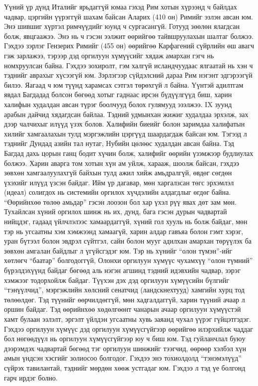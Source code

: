 Үүний үр дүнд Италийг ярьдаггүй юмаа гэхэд Рим хотын хүрээнд ч байлдах чадвар, цэргийн үүрэггүй шахам байсан Аларих (410 он) Римийг эзлэн авсан юм. Энэ шившиг хүртэл римчүүдийг юунд ч сургасангүй. Готууд зөөлөн ялагдсан болж, явцгаажээ. Энэ нь ч гэсэн ээлжит өөрийгөө тайвшруулахын шалтаг болжээ. Гэхдээ зэрлэг Гензерих Римийг (455 он) өөрийгөө Карфагений сүйрлийн өш авагч гэж зарлажээ, тэрээр дэд оргилуун хүмүүсийг хядаж амархан гэгч нь номхруулсан байна. Гэхдээ зохиролт, гэм халгүй исландчуудаас ялгаатай нь хэн ч тэднийг аврахыг хүсээгүй юм. Зэрлэгээр сүйдэлсний дараа Рим нэгэнт эдгэрээгүй билээ. Яагаад ч юм түүнд харамсах сэтгэл төрөхгүй л байна.
Үүнтэй адилтгам явдал Багдадад болсон бөгөөд хотыг гаднаас ирсэн бүдүүлгүүд биш, харин халифын худалдан авсан түрэг боолчууд болох гулямууд эзэлжээ. IX зуунд арабын дайчид хядагдсан байлаа. Тэдний удмынхан жижиг худалдаа эрхэлж, зах дээр чалчихыг илүүд үзэх болов. Халифийн биеийг болон заримдаа халифатын хилийг хамгаалахын тулд мэргэжлийн цэргүүд шаардагдаж байсан юм. Тэгээд л тэднийг Дундад азийн тал нутаг, Нубийн цөлөөс худалдан авсан байна. Тэд Багдад дахь цорын ганц бодит хүчин болж, халифийг өөрийн үзэмжээр будлиулах болжээ. Харин аварга том хотын хүн ам уйлж, харааж, шоолж байсан, гэхдээ зөвхөн хамгаалуулахгүй байхын тулд ажил хийж амьдралгүй, өвдөг сөгдөн үхэхийг илүүд үзсэн байдаг.
Ийм үр дагавар, мөн харгалзсан төгс эрхэмлэл (идеал) солигдох нь системийн оргилох хүчдэлийн алдагдлыг өгдөг байна. “Өөрийнхөө төлөө амьдар” гэсэн лоозон бол хар үхэл рүү явах дөт зам мөн.
Тухайлсан хүний оргилох шинж нь их, дунд, бага гэсэн дурын чадвартай нийцдэг, гадаад үйлчлэлээс хамаардаггүй, хүний гол хууль нь болж байдаг, мөн тэр нь угсаатны хэм хэмжээнд хамаагүй, харин алдар гавъяа болон гэмт хэрэг, уран бүтээл болон эвдрэл сүйтгэл, сайн болон мууг адилхан амархан төрүүлэх ба зөвхөн амгалан байдлыг л үгүйсгэдэг юм. Тэр нь хүнийг “олон түмэн”-ийг хөтлөгч “баатар” болгодоггүй, Олонхи оргилуун хүмүүс чухамхүү “олон түмний” бүрэлдэхүүнд байдаг бөгөөд аль нэгэн агшинд тэдний идэвхийн чадвар, зэрэг хэмжээг тодорхойлж байдаг.
Түүхэн дэх дэд оргилуун хүмүүсийн бүлгийг “тэнүүлчид”, мэргэжлийн хөлсний сенатчид (ландскнехтууд) хамгийн хурц тод төлөөлдөг. Тэд түүнийг өөрчилдөггүй, мөн хадгалдаггүй, харин түүний ачаар л оршин байдаг. Тэд өөрийнхөө хөдөлгөөнт чанарын ачаар оргилуун хүмүүстэй хамт булаан эзлэлт, эргэлт үйлдэн угсаатны хувь заяанд чухал үүрэг гүйцэтгэдэг. Гэхдээ оргилуун хүмүүс дэд оргилуун хүмүүсгүйгээр өөрийгөө илэрхийлж чаддаг бол нөгөөдүүл нь оргилуун хүмүүсгүйгээр юу ч биш юм. Тэд гуйланчлал буюу дээрэмдэх чадвартай бөгөөд тэг оргилуун шинжийг тээгчид, өөрөөр хэлбэл хүн амын үндсэн хэсгийг золиосоо болгодог. Гэхдээ энэ тохиолдолд “тэнэмэлүүд” сүйрэх тавилантай, тэднийг мөрдөн хөөж устгадаг юм. Гэхдээ л тэд үе болгонд гарч ирдэг болно.
